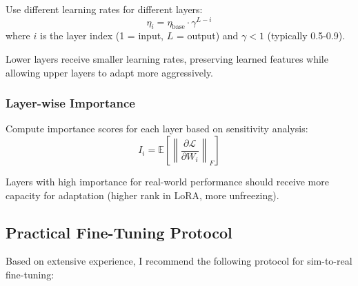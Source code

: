 Use different learning rates for different layers:
\begin{equation}
\eta_i = \eta_{\text{base}} \cdot \gamma^{L-i}
\label{eq:discriminative_lr}
\end{equation}
where $i$ is the layer index (1 = input, $L$ = output) and $\gamma < 1$ (typically 0.5-0.9).

Lower layers receive smaller learning rates, preserving learned features while allowing upper layers to adapt more aggressively.

\subsubsection{Layer-wise Importance}

Compute importance scores for each layer based on sensitivity analysis:
\begin{equation}
I_i = \mathbb{E} \left[ \left\| \frac{\partial \mathcal{L}}{\partial W_i} \right\|_F \right]
\end{equation}

Layers with high importance for real-world performance should receive more capacity for adaptation (higher rank in LoRA, more unfreezing).

\subsection{Practical Fine-Tuning Protocol}

Based on extensive experience, I recommend the following protocol for sim-to-real fine-tuning:

